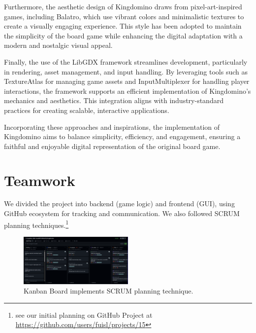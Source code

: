 \documentclass[conference]{IEEEtran}
\begin{document}
Furthermore, the aesthetic design of Kingdomino draws from pixel-art-inspired
games, including Balatro\cite{wiki:balatro}, which use vibrant colors and
minimalistic textures to create a visually engaging experience. This style has
been adopted to maintain the simplicity of the board game while enhancing the
digital adaptation with a modern and nostalgic visual appeal.

Finally, the use of the LibGDX framework\cite{libgdx} streamlines development,
particularly in rendering, asset management, and input handling. By leveraging
tools such as TextureAtlas\cite{wiki:textureatlas} for managing game assets and
InputMultiplexer for handling player interactions, the framework supports an
efficient implementation of Kingdomino's mechanics and aesthetics. This
integration aligns with industry-standard practices for creating scalable,
interactive applications.

Incorporating these approaches and inspirations, the implementation of
Kingdomino aims to balance simplicity, efficiency, and engagement, ensuring a
faithful and enjoyable digital representation of the original board game.


\section{Teamwork}
\label{sec:teamwork}

We divided the project into backend (game logic) and frontend (GUI), using
GitHub\cite{github:github} ecosystem for tracking and communication. We also followed SCRUM
planning techniques.\footnote{see our initial planning on GitHub Project at
    \url{https://github.com/users/fuisl/projects/15}}

\begin{figure}[htbp]
    \centerline{\includegraphics[width=0.5\textwidth]{assets/github-project.png}}
    \caption{Kanban Board implements SCRUM planning technique.}\label{fig:kanban}
\end{figure}
\end{document}
